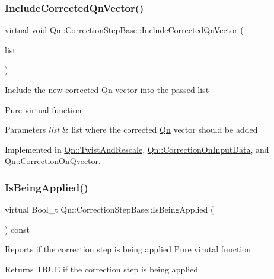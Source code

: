 \subsubsection{\texorpdfstring{Include\+Corrected\+Qn\+Vector()}{IncludeCorrectedQnVector()}}
{\footnotesize\ttfamily virtual void Qn\+::\+Correction\+Step\+Base\+::\+Include\+Corrected\+Qn\+Vector (\begin{DoxyParamCaption}\item[{T\+List $\ast$}]{list }\end{DoxyParamCaption})\hspace{0.3cm}{\ttfamily [pure virtual]}}

Include the new corrected \mbox{\hyperlink{namespaceQn}{Qn}} vector into the passed list

Pure virtual function 
\begin{DoxyParams}{Parameters}
{\em list} & list where the corrected \mbox{\hyperlink{namespaceQn}{Qn}} vector should be added \\
\hline
\end{DoxyParams}


Implemented in \mbox{\hyperlink{classQn_1_1TwistAndRescale_aad00583024f1a71458d6c86ba1cc4d44}{Qn\+::\+Twist\+And\+Rescale}}, \mbox{\hyperlink{classQn_1_1CorrectionOnInputData_a9072c5ffae945c464bed4ee3e60858a4}{Qn\+::\+Correction\+On\+Input\+Data}}, and \mbox{\hyperlink{classQn_1_1CorrectionOnQvector_a42d85f899f00a6e816969d5784c50765}{Qn\+::\+Correction\+On\+Qvector}}.

\mbox{\label{classQn_1_1CorrectionStepBase_aa99ab21886c2b4d8c3c6e1f60b84acc9}} 
\subsubsection{\texorpdfstring{Is\+Being\+Applied()}{IsBeingApplied()}}
{\footnotesize\ttfamily virtual Bool\+\_\+t Qn\+::\+Correction\+Step\+Base\+::\+Is\+Being\+Applied (\begin{DoxyParamCaption}{ }\end{DoxyParamCaption}) const\hspace{0.3cm}{\ttfamily [pure virtual]}}

Reports if the correction step is being applied Pure virutal function \begin{DoxyReturn}{Returns}
T\+R\+UE if the correction step is being applied 
\end{DoxyReturn}


